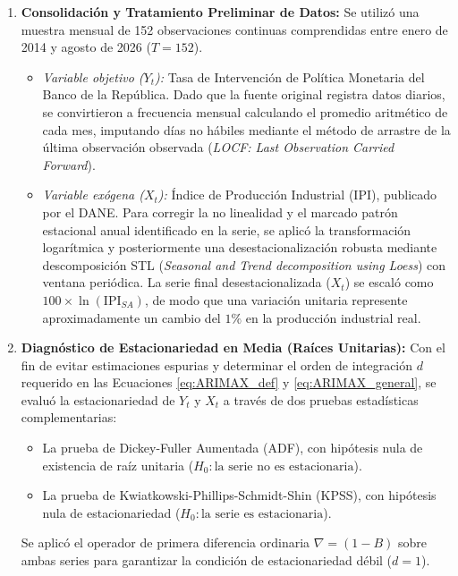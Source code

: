 \documentclass[11pt,letterpaper]{article}
\begin{document}
\begin{enumerate}
    \item \textbf{Consolidación y Tratamiento Preliminar de Datos:}
    Se utilizó una muestra mensual de 152 observaciones continuas comprendidas entre enero de 2014 y agosto de 2026 ($T = 152$). 
    \begin{itemize}
        \item \textit{Variable objetivo ($Y_t$):} Tasa de Intervención de Política Monetaria del Banco de la República. Dado que la fuente original registra datos diarios, se convirtieron a frecuencia mensual calculando el promedio aritmético de cada mes, imputando días no hábiles mediante el método de arrastre de la última observación observada (\textit{LOCF: Last Observation Carried Forward}).
        \item \textit{Variable exógena ($X_t$):} Índice de Producción Industrial (IPI), publicado por el DANE. Para corregir la no linealidad y el marcado patrón estacional anual identificado en la serie, se aplicó la transformación logarítmica y posteriormente una desestacionalización robusta mediante descomposición STL (\textit{Seasonal and Trend decomposition using Loess}) con ventana periódica. La serie final desestacionalizada ($X_t$) se escaló como $100 \times \ln(\text{IPI}_{SA})$, de modo que una variación unitaria represente aproximadamente un cambio del $1\%$ en la producción industrial real.
    \end{itemize}

    \item \textbf{Diagnóstico de Estacionariedad en Media (Raíces Unitarias):}
    Con el fin de evitar estimaciones espurias y determinar el orden de integración $d$ requerido en las Ecuaciones \ref{eq:ARIMAX_def} y \ref{eq:ARIMAX_general}, se evaluó la estacionariedad de $Y_t$ y $X_t$ a través de dos pruebas estadísticas complementarias:
    \begin{itemize}
        \item La prueba de Dickey-Fuller Aumentada (ADF), con hipótesis nula de existencia de raíz unitaria ($H_0: \text{la serie no es estacionaria}$).
        \item La prueba de Kwiatkowski-Phillips-Schmidt-Shin (KPSS), con hipótesis nula de estacionariedad ($H_0: \text{la serie es estacionaria}$).
    \end{itemize}
    Se aplicó el operador de primera diferencia ordinaria $\nabla = (1 - B)$ sobre ambas series para garantizar la condición de estacionariedad débil ($d=1$).


\end{enumerate}
\end{document}
